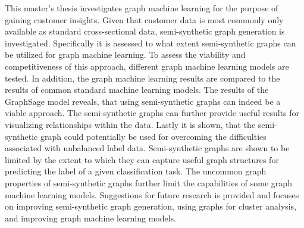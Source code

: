 
  \onehalfspacing

  This master's thesis investigates graph machine learning for the purpose of
  gaining customer insights. Given that customer data is most commonly only
  available as standard cross-sectional data, semi-synthetic graph generation is
  investigated. Specifically it is assessed to what extent semi-synthetic graphs
  can be utilized for graph machine learning. To assess the viability and
  competitiveness of this approach, different graph machine learning models
  are tested. In addition, the graph machine learning results are compared to
  the results of common standard machine learning models. The results of
  the GraphSage model reveals, that using semi-synthetic graphs can indeed be a
  viable approach. The semi-synthetic graphs can further provide useful results
  for visualizing relationships within the data. Lastly it is shown, that the
  semi-synthetic graph could potentially be used for overcoming the
  difficulties associated with unbalanced label data. Semi-synthetic graphs are 
  shown to be limited by the extent to which they can capture useful graph 
  structures for predicting the label of a given classification task. The
  uncommon graph properties of semi-synthetic graphs further limit the
  capabilities of some graph machine learning models. Suggestions for future 
  research is provided and focuses on improving semi-synthetic graph generation, 
  using graphs for cluster analysis, and improving graph machine learning models.
